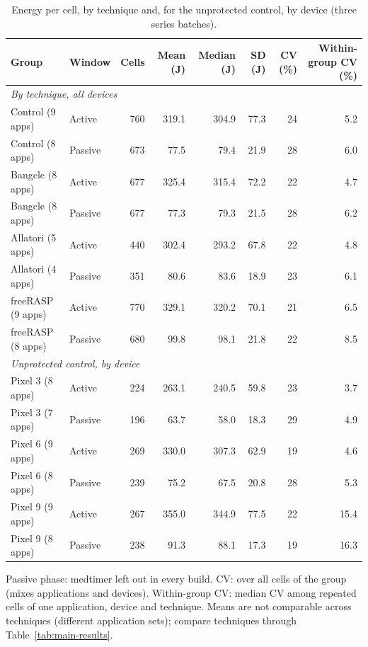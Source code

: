 \begin{table}[t]
\centering
\small
\caption{Energy per cell, by technique and, for the unprotected control, by device (three series batches).}
\label{tab:descriptives}
\begin{tabular}{llrrrrrr}
\toprule
\textbf{Group} & \textbf{Window} & \textbf{Cells} & \textbf{Mean (J)} & \textbf{Median (J)} & \textbf{SD (J)} & \textbf{CV (\%)} & \textbf{Within-group CV (\%)} \\
\midrule
\multicolumn{8}{l}{\textit{By technique, all devices}} \\
Control (9 apps) & Active & 760 & 319.1 & 304.9 & 77.3 & 24 & 5.2 \\
Control (8 apps) & Passive & 673 & 77.5 & 79.4 & 21.9 & 28 & 6.0 \\
Bangcle (8 apps) & Active & 677 & 325.4 & 315.4 & 72.2 & 22 & 4.7 \\
Bangcle (8 apps) & Passive & 677 & 77.3 & 79.3 & 21.5 & 28 & 6.2 \\
Allatori (5 apps) & Active & 440 & 302.4 & 293.2 & 67.8 & 22 & 4.8 \\
Allatori (4 apps) & Passive & 351 & 80.6 & 83.6 & 18.9 & 23 & 6.1 \\
freeRASP (9 apps) & Active & 770 & 329.1 & 320.2 & 70.1 & 21 & 6.5 \\
freeRASP (8 apps) & Passive & 680 & 99.8 & 98.1 & 21.8 & 22 & 8.5 \\
\midrule
\multicolumn{8}{l}{\textit{Unprotected control, by device}} \\
Pixel 3 (8 apps) & Active & 224 & 263.1 & 240.5 & 59.8 & 23 & 3.7 \\
Pixel 3 (7 apps) & Passive & 196 & 63.7 & 58.0 & 18.3 & 29 & 4.9 \\
Pixel 6 (9 apps) & Active & 269 & 330.0 & 307.3 & 62.9 & 19 & 4.6 \\
Pixel 6 (8 apps) & Passive & 239 & 75.2 & 67.5 & 20.8 & 28 & 5.3 \\
Pixel 9 (9 apps) & Active & 267 & 355.0 & 344.9 & 77.5 & 22 & 15.4 \\
Pixel 9 (8 apps) & Passive & 238 & 91.3 & 88.1 & 17.3 & 19 & 16.3 \\
\bottomrule
\end{tabular}
\par\smallskip\footnotesize Passive phase: medtimer left out in every build. CV: over all cells of the group (mixes applications and devices). Within-group CV: median CV among repeated cells of one application, device and technique. Means are not comparable across techniques (different application sets); compare techniques through Table~\ref{tab:main-results}.
\end{table}

